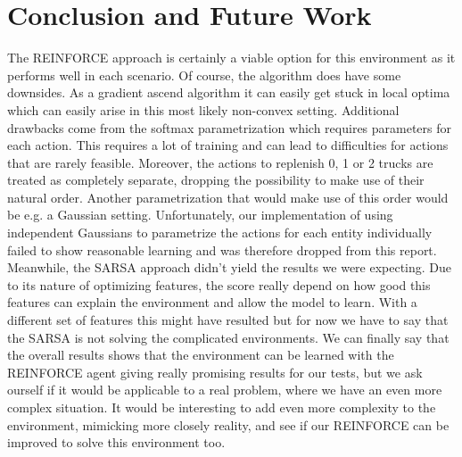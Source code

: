 \documentclass[journal, a4paper]{IEEEtran}
\theoremstyle{plain}
\theoremstyle{definition}
\begin{document}
\section{Conclusion and Future Work}
The REINFORCE approach is certainly a viable option for this environment as it performs well in each scenario. Of course, the algorithm does have some downsides. As a gradient ascend algorithm it can easily get stuck in local optima which can easily arise in this most likely non-convex setting. 
Additional drawbacks come from the softmax parametrization which 
requires parameters for each action. This requires a lot of training and can lead to difficulties for actions that are rarely feasible. Moreover, the actions to replenish 0, 1 or 2 trucks are treated as completely separate, dropping the possibility to make use of their natural order. Another parametrization that would make use of this order would be e.g. a Gaussian setting. 
Unfortunately, our implementation of using independent Gaussians to parametrize the actions for each entity individually failed to show reasonable learning and was therefore dropped from this report.
Meanwhile, the SARSA approach didn't yield the results we were expecting. Due to its nature of optimizing features, the score really depend on how good this features can explain the environment and allow the model to learn. With a different set of features this might have resulted but for now we have to say that the SARSA is not solving the complicated environments. 
We can finally say that the overall results shows that the environment can be learned with the REINFORCE agent giving really promising results for our tests, but we ask ourself if it would be applicable to a real problem, where we have an even more complex situation. It would be interesting to add even more complexity to the environment, mimicking more closely reality, and see if our REINFORCE can be improved to solve this environment too. 


\end{document}
